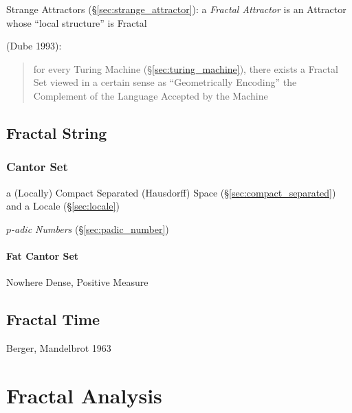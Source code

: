 \fist Strange Attractors (\S\ref{sec:strange_attractor}): a \emph{Fractal
  Attractor} is an Attractor whose ``local structure'' is Fractal

\asterism

(Dube 1993):
\begin{quote}
  for every Turing Machine (\S\ref{sec:turing_machine}), there exists a Fractal
  Set viewed in a certain sense as ``Geometrically Encoding'' the Complement of
  the Language Accepted by the Machine
\end{quote}



\subsection{Fractal String}\label{sec:fractal_string}

\subsubsection{Cantor Set}\label{sec:cantor_set}

a (Locally) Compact Separated (Hausdorff) Space (\S\ref{sec:compact_separated})
and a Locale (\S\ref{sec:locale})

\emph{$p$-adic Numbers} (\S\ref{sec:padic_number})



\paragraph{Fat Cantor Set}\label{sec:fat_cantor_set}\hfill

Nowhere Dense, Positive Measure



\subsection{Fractal Time}\label{sec:fractal_time}

Berger, Mandelbrot 1963



\section{Fractal Analysis}\label{sec:fractal_analysis}

